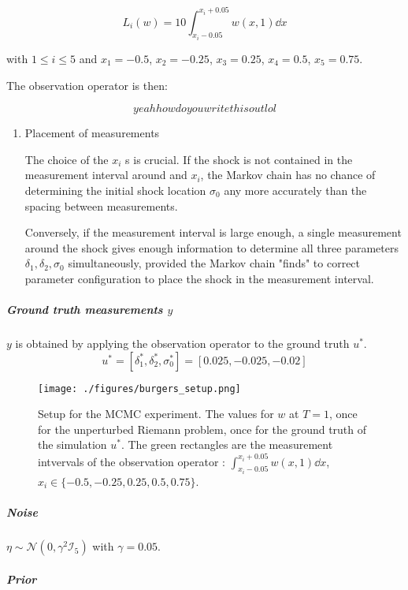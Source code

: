 \documentclass[11pt]{article}
\newcommand{\I}{{\mathcal{I}}}
\newcommand{\N}[2]{\mathcal{N}\left(#1,#2\right)}
\begin{document}
\begin{equation}
L_i(w) = 10 \int_{x_i - 0.05}^{x_i + 0.05} w(x, 1) \dd x
\end{equation}

with \(1 \leq i \leq 5\) and \(x_1 = -0.5\), \(x_2= -0.25\), \(x_3 = 0.25\), \(x_4 = 0.5\), \(x_5 = 0.75\).

The observation operator is then:

$$yeah how do you write this out lol$$

\begin{enumerate}
\item Placement of measurements
\label{sec:orga7b7789}

The choice of the \(x_i\) s is crucial. If the shock is not contained in the measurement
interval around and \(x_i\), the Markov chain has no chance of determining the initial
shock location \(\sigma_0\) any more accurately than the spacing between measurements.

Conversely, if the measurement interval is large enough, a single measurement around the
shock gives enough information to determine all three parameters \(\delta_1, \delta_2, \sigma_0\)
simultaneously, provided the Markov chain "finds" to correct parameter configuration to place the
shock in the measurement interval.
\end{enumerate}

\subparagraph{Ground truth measurements \(y\)}
\label{sec:org326a9ba}

\(y\) is obtained by applying the observation operator to the ground truth \(u^*\).
$$u^* = [\delta_1^*, \delta_2^*, \sigma_0^*] = [0.025, -0.025, -0.02]$$

\begin{figure}[htbp]
\centering
\texttt{[image: ./figures/burgers\_setup.png]}
\caption{\label{fig:burgers_setup}
Setup for the MCMC experiment. The values for \(w\) at \(T=1\), once for the unperturbed Riemann problem, once for the ground truth of the simulation \(u^*\). The green rectangles are the measurement intvervals of the observation operator : \(\int_{x_i - 0.05}^{x_i + 0.05} w(x,1)\dd x\), \(x_i \in \{ -0.5, -0.25, 0.25, 0.5, 0.75 \}\).}
\end{figure}

\subparagraph{Noise}
\label{sec:org47dd935}

\(\eta \sim \N{0}{\gamma^2 \I_5}\) with \(\gamma = 0.05\).

\subparagraph{Prior}
\label{sec:orgd00ab74}
\end{document}
